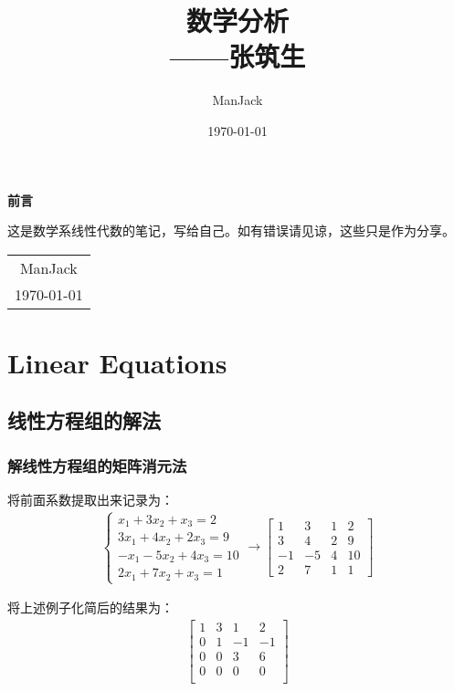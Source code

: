 \documentclass[10pt, a4paper, oneside, UTF8]{ctexbook}
\title{{\Huge{\textbf{数学分析}}}\\------张筑生}
\author{ManJack}
\date{\today}
\begin{document}
\maketitle

\setcounter{page}{1}

\newpage
\begin{center}
  \Huge\textbf{前言}
\end{center}

这是数学系线性代数的笔记，写给自己。如有错误请见谅，这些只是作为分享。

\begin{flushright}
  \begin{tabular}{c}
    ManJack \\
    \today
  \end{tabular}
\end{flushright}

\newpage
\tableofcontents
\newpage
{}
\setcounter{page}{1}

\chapter{Linear Equations}


\section{线性方程组的解法}
\subsection{解线性方程组的矩阵消元法}

\begin{example}
  将前面系数提取出来记录为：
  \begin{align}
    \begin{cases}
      x_1+3x_{2}+x_3=2 \\
      3x_1+4x_2+2x_3 = 9 \\
      -x_1-5x_{2}+4x_{3} = 10\\
      2x_{1}+7x_{2} +x_{3}= 1
    \end{cases} \longrightarrow
    \begin{bmatrix}
      1 &3&1&2\\
      3&4&2&9\\
      -1&-5&4&10\\
      2&7&1&1
    \end{bmatrix}
  \end{align}

  将上述例子化简后的结果为：
  \begin{align}
    \begin{bmatrix}
      1 & 3 & 1 & 2 \\
      0 & 1 & -1 & -1 \\
      0 & 0 & 3 & 6 \\
      0 & 0 & 0 & 0 \\
    \end{bmatrix}
  \end{align}
\end{example}
\end{document}
